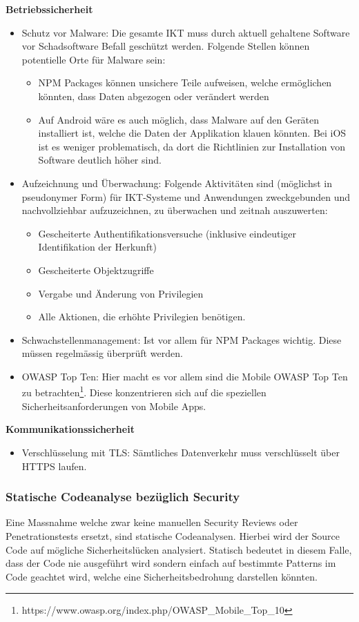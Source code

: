 \textbf{Betriebssicherheit}
\begin{itemize}
    \item Schutz vor Malware: Die gesamte IKT muss durch aktuell gehaltene Software vor Schadsoftware Befall geschützt werden. Folgende Stellen können potentielle Orte für Malware sein:
    \begin{itemize}
        \item  NPM Packages können unsichere Teile aufweisen, welche ermöglichen könnten, dass Daten abgezogen oder verändert werden
        \item Auf Android wäre es auch möglich, dass Malware auf den Geräten installiert ist, welche die Daten der Applikation klauen könnten. Bei iOS ist es weniger problematisch, da dort die Richtlinien zur Installation von Software deutlich höher sind.
    \end{itemize}
    \item Aufzeichnung und Überwachung: Folgende Aktivitäten sind (möglichst in pseudonymer Form) für IKT-Systeme und Anwendungen zweckgebunden und nachvollziehbar aufzuzeichnen, zu überwachen und zeitnah auszuwerten:
    \begin{itemize}
        \item Gescheiterte Authentifikationsversuche (inklusive eindeutiger Identifikation der Herkunft)
        \item Gescheiterte Objektzugriffe
        \item  Vergabe und Änderung von Privilegien
        \item  Alle Aktionen, die erhöhte Privilegien benötigen.
    \end{itemize}
    \item  Schwachstellenmanagement: Ist vor allem für NPM Packages wichtig. Diese müssen regelmässig überprüft werden.
    \item OWASP Top Ten: Hier macht es vor allem sind die Mobile OWASP Top Ten zu betrachten\footnote{https://www.owasp.org/index.php/OWASP\_Mobile\_Top\_10}. Diese konzentrieren sich auf die speziellen Sicherheitsanforderungen von Mobile Apps.
\end{itemize}

\textbf{Kommunikationssicherheit}
\begin{itemize}
    \item  Verschlüsselung mit TLS: Sämtliches Datenverkehr muss verschlüsselt über HTTPS laufen.
\end{itemize}

\subsubsection{Statische Codeanalyse bezüglich Security}
Eine Massnahme welche zwar keine manuellen Security Reviews oder Penetrationstests ersetzt, sind statische Codeanalysen. Hierbei wird der Source Code auf mögliche Sicherheitslücken analysiert. Statisch bedeutet in diesem Falle, dass der Code nie ausgeführt wird sondern einfach auf bestimmte Patterns im Code geachtet wird, welche eine Sicherheitsbedrohung darstellen könnten.


